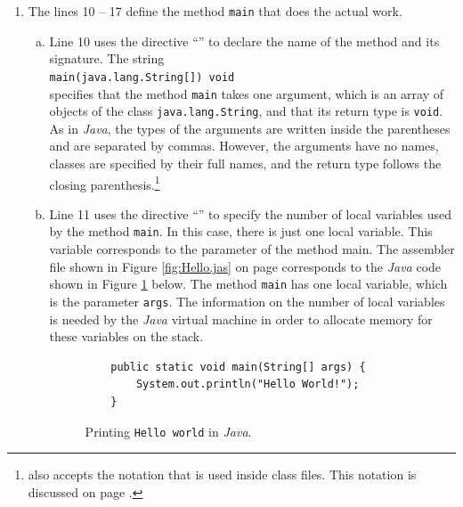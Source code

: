 \begin{enumerate}
      As this code is copied verbatim to the beginning 
      of every class file, we will not discuss it further. 
\item The lines 10 -- 17 define the method \texttt{main} that does the actual work.
  \begin{enumerate}[(a)]
  \item Line 10 uses the directive ``\texttt{}'' to declare the name of the method and its
        signature.  The string 
        \\[0.2cm]
        \hspace*{1.3cm}
        \texttt{main(java.lang.String[]) void}
        \\[0.2cm]
        specifies that the method \texttt{main} takes one argument, which is an array of objects of the
        class \texttt{java.lang.String}, and that its return type is \texttt{void}.  As in \textsl{Java}, the
        types of the arguments are written inside the parentheses and are separated by commas.  However, the
        arguments have no names, classes are specified by their full names, and the return type follows the
        closing parenthesis.\footnote{
           also accepts the notation that is used inside class files.  This notation is
          discussed on page \pageref{jvm-descriptors}.}
  \item Line 11 uses the directive ``\texttt{}'' to specify the number of local variables 
        used by the method \texttt{main}.  In this case, there is just one local variable.  This variable
        corresponds to the parameter of the method main.  The assembler file shown in Figure
        \ref{fig:Hello.jas} on page \pageref{fig:Hello.jas} corresponds to the \textsl{Java} code
        shown in Figure \ref{fig:Hello.java} below.  The method \texttt{main} has one local
        variable, which is the parameter \texttt{args}.
        The information on the number of local variables is needed by the \textsl{Java} virtual
        machine in order to allocate memory for these variables on the stack.

        
\begin{figure}[!ht]
\centering
\begin{verbatim}
    public static void main(String[] args) {
        System.out.println("Hello World!");
    }
\end{verbatim}
\vspace*{-0.3cm}
\caption{Printing \texttt{Hello world} in \textsl{Java}.} 
\label{fig:Hello.java}
\end{figure}


\end{enumerate}
\end{enumerate}
